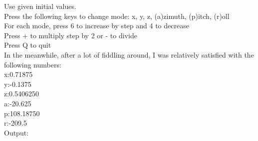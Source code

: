 Use given initial values.\\
Press the following keys to change mode: x, y, z, (a)zimuth, (p)itch, (r)oll\\
For each mode, press 6 to increase by step and 4 to decrease\\
Press + to multiply step by 2 or - to divide\\
Press Q to quit\\



In the meanwhile, after a lot of fiddling around, I was relatively satisfied with the following numbers:\\
x:0.71875\\
y:-0.1375\\
z:0.5406250\\
a:-20.625\\
p:108.18750\\
r:-209.5\\
Output:\\

